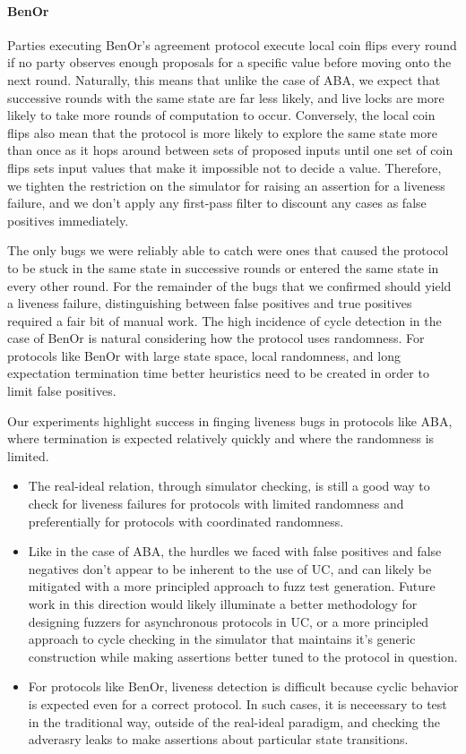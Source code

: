 \paragraph{BenOr}
Parties executing BenOr's agreement protocol execute local coin flips every
round if no party observes enough proposals for a specific value before moving
onto the next round.  Naturally, this means that unlike the case of ABA, we
expect that successive rounds with the same state are far less likely, and live
locks are more likely to take more rounds of computation to occur.  Conversely,
the local coin flips also mean that the protocol is more likely to explore the
same state more than once as it hops around between sets of proposed inputs
until one set of coin flips sets input values that make it impossible not to
decide a value.  Therefore, we tighten the restriction on the simulator for
raising an assertion for a liveness failure, and we don't apply any first-pass
filter to discount any cases as false positives immediately. 

The only bugs we were reliably able to catch were ones that caused the protocol
to be stuck in the same state in successive rounds or entered the same state in
every other round.  For the remainder of the bugs that we confirmed should
yield a liveness failure, distinguishing between false positives and true
positives required a fair bit of manual work.  The high incidence of cycle
detection in the case of BenOr is natural considering how the protocol uses
randomness.  For protocols like BenOr with large state space, local randomness,
and long expectation termination time better heuristics need to be created in
order to limit false positives.

Our experiments highlight success in finging liveness bugs in protocols like
ABA, where termination is expected relatively quickly and where the randomness
is limited.  \begin{itemize} \item The real-ideal relation, through simulator
checking, is still a good way to check for liveness failures for protocols with
limited randomness and preferentially for protocols with coordinated
randomness.  \item Like in the case of ABA, the hurdles we faced with false
positives and false negatives don't appear to be inherent to the use of UC, and
can likely be mitigated with a more principled approach to fuzz test
generation. Future work in this direction would likely illuminate a better
methodology for designing fuzzers for asynchronous protocols in UC, or a more
principled approach to cycle checking in the simulator that maintains it's
generic construction while making assertions better tuned to the protocol in
question.  \item For protocols like BenOr, liveness detection is difficult
because cyclic behavior is expected even for a correct protocol. In such cases,
it is neceessary to test in the traditional way, outside of the real-ideal
paradigm, and checking the adverasry leaks to make assertions about particular
state transitions.  \end{itemize}

